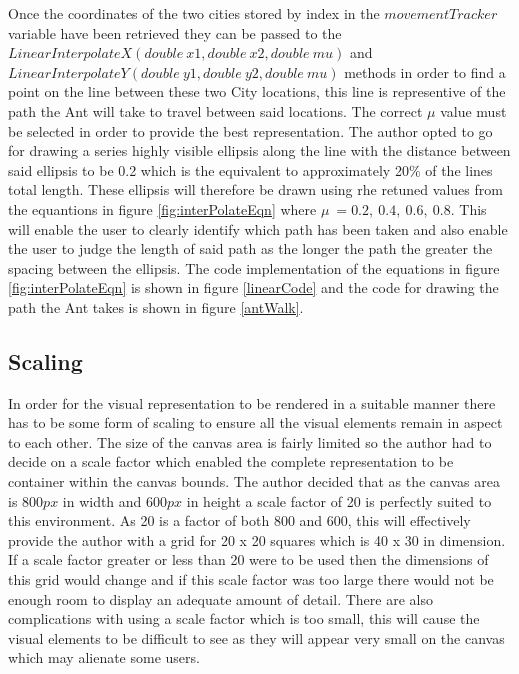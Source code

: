Once the coordinates of the two cities stored by index in the $movementTracker$ variable have been retrieved they can be passed to the $LinearInterpolateX(double\ x1, double\ x2, double\ mu)$ and $LinearInterpolateY(double\ y1, double\ y2, double\ mu)$ methods in order to find a point on the line between these two City locations, this line is representive of the path the Ant will take to travel between said locations. The correct $\mu$ value must be selected in order to provide the best representation. The author opted to go for drawing a series highly visible ellipsis along the line with the distance between said ellipsis to be 0.2 which is the equivalent to approximately 20\% of the lines total length. These ellipsis will therefore be drawn using rhe retuned values from the equantions in figure \ref{fig:interPolateEqn} where $\mu\ = 0.2,\ 0.4,\ 0.6,\ 0.8$. This will enable the user to clearly identify which path has been taken and also enable the user to judge the length of said path as the longer the path the greater the spacing between the ellipsis. The code implementation of the equations in figure \ref{fig:interPolateEqn} is shown in figure \ref{linearCode} and the code for drawing the path the Ant takes is shown in figure \ref{antWalk}.

\subsection{Scaling}
\label{scaley}
In order for the visual representation to be rendered in a suitable manner there has to be some form of scaling to ensure all the visual elements remain in aspect to each other. The size of the canvas area is fairly limited so the author had to decide on a scale factor which enabled the complete representation to be container within the canvas bounds. The author decided that as the canvas area is $800px$ in width and $600px$ in height a scale factor of 20 is perfectly suited to this environment. As 20 is a factor of both 800 and 600, this will effectively provide the author with a grid for 20 x 20 squares which is 40 x 30 in dimension. If a scale factor greater or less than 20 were to be used then the dimensions of this grid would change and if this scale factor was too large there would not be enough room to display an adequate amount of detail. There are also complications with using a scale factor which is too small, this will cause the visual elements to be difficult to see as they will appear very small on the canvas which may alienate some users.

